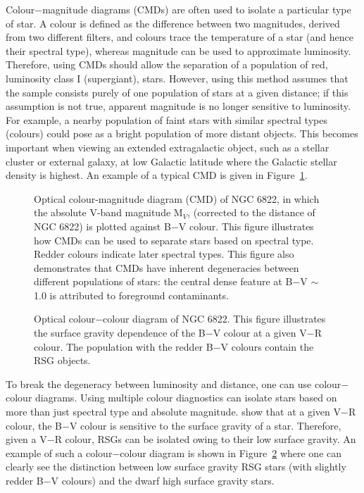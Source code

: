 Colour$-$magnitude diagrams (CMDs) are often used to isolate a particular type of star.
A colour is defined as the difference between two magnitudes, derived from  two different filters, and colours trace the temperature of a star (and hence their spectral type), whereas magnitude can be used to approximate luminosity.
Therefore, using CMDs should allow the separation of a population of red, luminosity class I (supergiant), stars.
However, using this method assumes that the sample consists purely of one population of stars at a given distance; if this assumption is not true, apparent magnitude is no longer sensitive to luminosity.
For example, a nearby population of faint stars with similar spectral types (colours) could pose as a bright population of more distant objects.
This becomes important when viewing an extended extragalactic object, such as a stellar cluster or external galaxy, at low Galactic latitude where the Galactic stellar density is highest.
An example of a typical CMD is given in Figure~\ref{CMD}.
\begin{figure}[t]
  \begin{center}
  \epsfxsize=150mm         %
  \caption{Optical colour-magnitude diagram (CMD) of NGC 6822, in which the absolute V-band magnitude M$_{V}$, (corrected to the distance of NGC 6822) is plotted against B$-$V colour.
This figure illustrates how CMDs can be used to separate stars based on spectral type. Redder colours indicate later spectral types.
This figure also demonstrates that CMDs have inherent degeneracies  between different populations of stars: the central dense feature at B$-$V $\sim$ 1.0 is attributed to foreground contaminants.}
    \label{CMD}
    \end{center}
 \end{figure}

\begin{figure}[t]
  \begin{center}
  \epsfxsize=150mm         %
  \caption{Optical colour$-$colour diagram of NGC 6822. This figure illustrates the surface gravity dependence of the B$-$V colour at a given V$-$R colour. The population with the redder B$-$V colours contain the RSG objects.}
    \label{CCD}
    \end{center}
 \end{figure}

To break the degeneracy between luminosity and distance, one can use colour$-$colour diagrams.
Using multiple colour diagnostics can isolate stars based on more than just spectral type and absolute magnitude.
\cite{Massey98} show that at a given V$-$R colour, the B$-$V colour is sensitive to the surface gravity of a star.
Therefore, given a V$-$R colour, RSGs can be isolated owing to their low surface gravity.
An example of such a colour$-$colour diagram is shown in Figure~\ref{CCD} where one can clearly see the distinction between low surface gravity RSG stars (with slightly redder B$-$V colours) and the dwarf high surface gravity stars.


